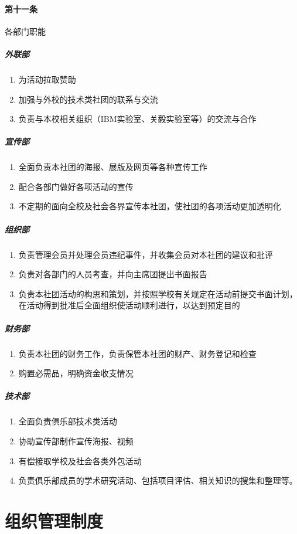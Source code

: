 \documentclass{club}
\begin{document}
\paragraph{第十一条}各部门职能
\subparagraph{外联部}
\begin{enumerate}
    \item 为活动拉取赞助
    \item 加强与外校的技术类社团的联系与交流
    \item 负责与本校相关组织（IBM实验室、关毅实验室等）的交流与合作
\end{enumerate}
\subparagraph{宣传部}
\begin{enumerate}
    \item 全面负责本社团的海报、展版及网页等各种宣传工作
    \item 配合各部门做好各项活动的宣传
    \item 不定期的面向全校及社会各界宣传本社团，使社团的各项活动更加透明化
\end{enumerate}
\subparagraph{组织部}
\begin{enumerate}
    \item 负责管理会员并处理会员违纪事件，并收集会员对本社团的建议和批评
    \item 负责对各部门的人员考查，并向主席团提出书面报告
    \item 负责本社团活动的构思和策划，并按照学校有关规定在活动前提交书面计划，在活动得到批准后全面组织使活动顺利进行，以达到预定目的
\end{enumerate}
\subparagraph{财务部}
\begin{enumerate}
    \item 负责本社团的财务工作，负责保管本社团的财产、财务登记和检查
    \item 购置必需品，明确资金收支情况
\end{enumerate}
\subparagraph{技术部}
\begin{enumerate}
    \item 全面负责俱乐部技术类活动
    \item 协助宣传部制作宣传海报、视频
    \item 有偿接取学校及社会各类外包活动
    \item 负责俱乐部成员的学术研究活动、包括项目评估、相关知识的搜集和整理等。
\end{enumerate}

\section{组织管理制度}
\end{document}
